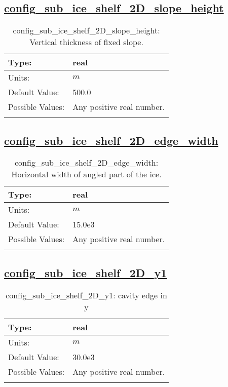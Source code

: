 \subsection[config\_sub\_ice\_shelf\_2D\_slope\_height]{\hyperref[sec:nm_tab_sub_ice_shelf_2D]{config\_sub\_ice\_shelf\_2D\_slope\_height}}
\label{subsec:nm_sec_config_sub_ice_shelf_2D_slope_height}
\begin{center}
\begin{longtable}{| p{2.0in} || p{4.0in} |}
    \hline
    Type: & real \\
    \hline
    Units: & $m$ \\
    \hline
    Default Value: & 500.0 \\
    \hline
    Possible Values: & Any positive real number. \\
    \hline
    \caption{config\_sub\_ice\_shelf\_2D\_slope\_height: Vertical thickness of fixed slope.}
\end{longtable}
\end{center}
\subsection[config\_sub\_ice\_shelf\_2D\_edge\_width]{\hyperref[sec:nm_tab_sub_ice_shelf_2D]{config\_sub\_ice\_shelf\_2D\_edge\_width}}
\label{subsec:nm_sec_config_sub_ice_shelf_2D_edge_width}
\begin{center}
\begin{longtable}{| p{2.0in} || p{4.0in} |}
    \hline
    Type: & real \\
    \hline
    Units: & $m$ \\
    \hline
    Default Value: & 15.0e3 \\
    \hline
    Possible Values: & Any positive real number. \\
    \hline
    \caption{config\_sub\_ice\_shelf\_2D\_edge\_width: Horizontal width of angled part of the ice.}
\end{longtable}
\end{center}
\subsection[config\_sub\_ice\_shelf\_2D\_y1]{\hyperref[sec:nm_tab_sub_ice_shelf_2D]{config\_sub\_ice\_shelf\_2D\_y1}}
\label{subsec:nm_sec_config_sub_ice_shelf_2D_y1}
\begin{center}
\begin{longtable}{| p{2.0in} || p{4.0in} |}
    \hline
    Type: & real \\
    \hline
    Units: & $m$ \\
    \hline
    Default Value: & 30.0e3 \\
    \hline
    Possible Values: & Any positive real number. \\
    \hline
    \caption{config\_sub\_ice\_shelf\_2D\_y1: cavity edge in y}
\end{longtable}
\end{center}
